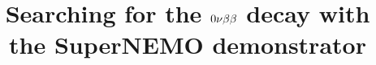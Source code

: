 \documentclass[11pt, oneside]{memoir}   	%
\title{Searching for the $0\nu\beta\beta$ decay with the SuperNEMO demonstrator}
\begin{document}
\maketitle
\pagebreak
\tableofcontents





\end{document}
